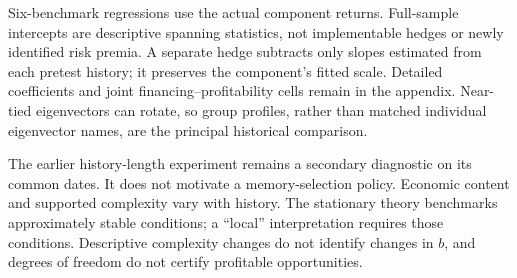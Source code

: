 Six-benchmark regressions use the actual component returns. Full-sample
intercepts are descriptive spanning statistics, not implementable hedges or
newly identified risk premia. A separate hedge subtracts only slopes estimated
from each pretest history; it preserves the component's fitted scale. Detailed
coefficients and joint financing--profitability cells remain in the appendix.
Near-tied eigenvectors can rotate, so group profiles, rather than matched
individual eigenvector names, are the principal historical comparison.

The earlier history-length experiment remains a secondary diagnostic on its
common dates. It does not motivate a memory-selection policy. Economic
content and supported complexity vary with history. The stationary theory
benchmarks approximately stable conditions; a ``local'' interpretation requires
those conditions. Descriptive complexity changes do not identify changes in
$b$, and degrees of freedom do not certify profitable opportunities.
